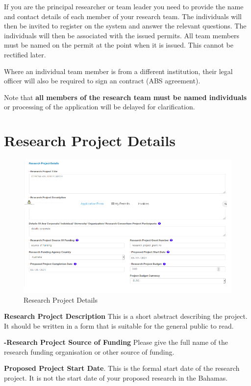 \documentclass[
]{book}
\begin{document}
If you are the principal researcher or team leader you need to provide the name and contact details of each member of your research team. The individuals will then be invited to register on the system and answer the relevant questions. The individuals will then be associated with the issued permits. All team members must be named on the permit at the point when it is issued. This cannot be rectified later.

Where an individual team member is from a different institution, their legal officer will also be required to sign an contract (ABS agreement).

Note that \textbf{all members of the research team must be named individuals} or processing of the application will be delayed for clarification.

\hypertarget{research-project-details}{%
\section{Research Project Details}\label{research-project-details}}

\begin{figure}
\centering
\includegraphics{images/research_project_details.png}
\caption{Research Project Details}
\end{figure}

\textbf{Research Project Description} This is a short abstract describing the project. It should be written in a form that is suitable for the general public to read.

\textbf{-Research Project Source of Funding} Please give the full name of the research funding organisation or other source of funding.

\textbf{Proposed Project Start Date}. This is the formal start date of the research project. It is not the start date of your proposed research in the Bahamas.
\end{document}
